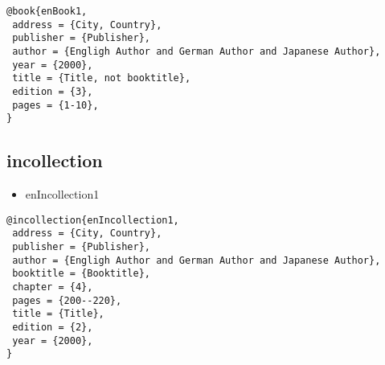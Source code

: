 \documentclass[9pt, twocolumn, a4paper]{jsarticle}
\begin{document}
\begin{bibunit}[IEEJtran]
\begin{lstlisting}
@book{enBook1,
 address = {City, Country},
 publisher = {Publisher},
 author = {Engligh Author and German Author and Japanese Author},
 year = {2000},
 title = {Title, not booktitle},
 edition = {3},
 pages = {1-10},
}
\end{lstlisting}

\subsection{incollection}

\begin{itemize}
  \item enIncollection1 \cite{enIncollection1}
\end{itemize}

\begin{lstlisting}
@incollection{enIncollection1,
 address = {City, Country},
 publisher = {Publisher},
 author = {Engligh Author and German Author and Japanese Author},
 booktitle = {Booktitle},
 chapter = {4},
 pages = {200--220},
 title = {Title},
 edition = {2},
 year = {2000},
}
\end{lstlisting}

{\footnotesize \putbib[samplebib]}
\end{bibunit}

\clearpage
\end{document}
